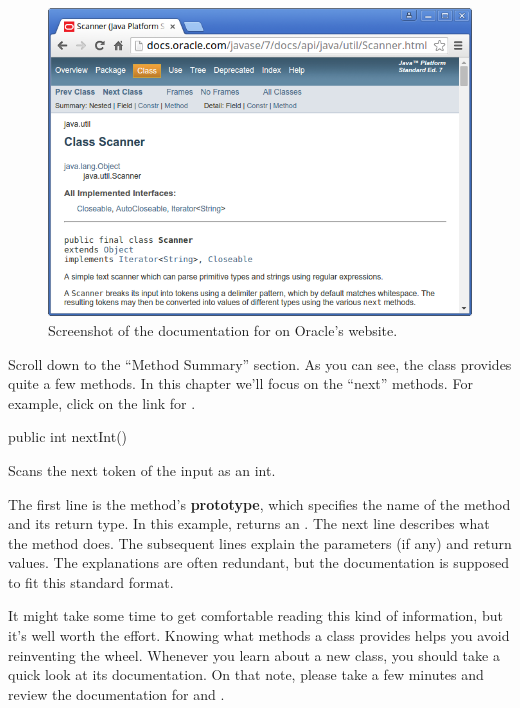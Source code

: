 \begin{figure}[!h]
\includegraphics[width=\textwidth]{scanner.png}
\caption{Screenshot of the documentation for  on Oracle's website.}
\end{figure}

Scroll down to the ``Method Summary'' section.
As you can see, the  class provides quite a few methods.
In this chapter we'll focus on the ``next'' methods.
For example, click on the link for .

\begin{stdout}
public int nextInt()

Scans the next token of the input as an int.
\end{stdout}


The first line is the method's {\bf prototype}, which specifies the name of the method and its return type.
In this example,  returns an .
The next line describes what the method does.
The subsequent lines explain the parameters (if any) and return values.
The explanations are often redundant, but the documentation is supposed to fit this standard format.

It might take some time to get comfortable reading this kind of information, but it's well worth the effort.
Knowing what methods a class provides helps you avoid reinventing the wheel.
Whenever you learn about a new class, you should take a quick look at its documentation.
On that note, please take a few minutes and review the documentation for  and .


